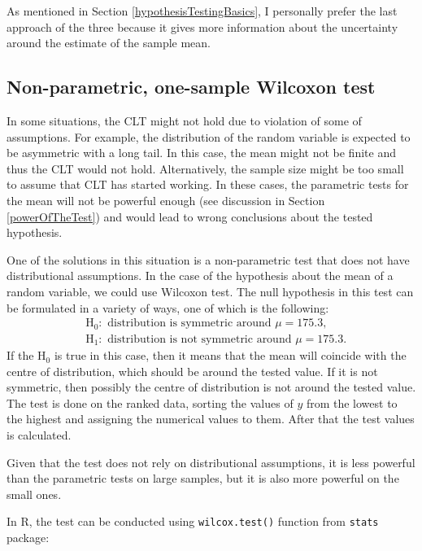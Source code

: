 \documentclass[
]{book}
\theoremstyle{definition}
\theoremstyle{definition}
\theoremstyle{definition}
\theoremstyle{definition}
\theoremstyle{remark}
\begin{document}
As mentioned in Section \ref{hypothesisTestingBasics}, I personally prefer the last approach of the three because it gives more information about the uncertainty around the estimate of the sample mean.

\subsection{Non-parametric, one-sample Wilcoxon test}\label{non-parametric-one-sample-wilcoxon-test}

In some situations, the CLT might not hold due to violation of some of assumptions. For example, the distribution of the random variable is expected to be asymmetric with a long tail. In this case, the mean might not be finite and thus the CLT would not hold. Alternatively, the sample size might be too small to assume that CLT has started working. In these cases, the parametric tests for the mean will not be powerful enough (see discussion in Section \ref{powerOfTheTest}) and would lead to wrong conclusions about the tested hypothesis.

One of the solutions in this situation is a non-parametric test that does not have distributional assumptions. In the case of the hypothesis about the mean of a random variable, we could use Wilcoxon test. The null hypothesis in this test can be formulated in a variety of ways, one of which is the following:
\begin{equation*}
    \begin{aligned}
        &\mathrm{H}_0: \text{ distribution is symmetric around } \mu = 175.3, \\
        &\mathrm{H}_1: \text{ distribution is not symmetric around } \mu = 175.3 .
    \end{aligned}
\end{equation*}
If the H\(_0\) is true in this case, then it means that the mean will coincide with the centre of distribution, which should be around the tested value. If it is not symmetric, then possibly the centre of distribution is not around the tested value. The test is done on the ranked data, sorting the values of \(y\) from the lowest to the highest and assigning the numerical values to them. After that the test values is calculated.

Given that the test does not rely on distributional assumptions, it is less powerful than the parametric tests on large samples, but it is also more powerful on the small ones.

In R, the test can be conducted using \texttt{wilcox.test()} function from \texttt{stats} package:
\end{document}
